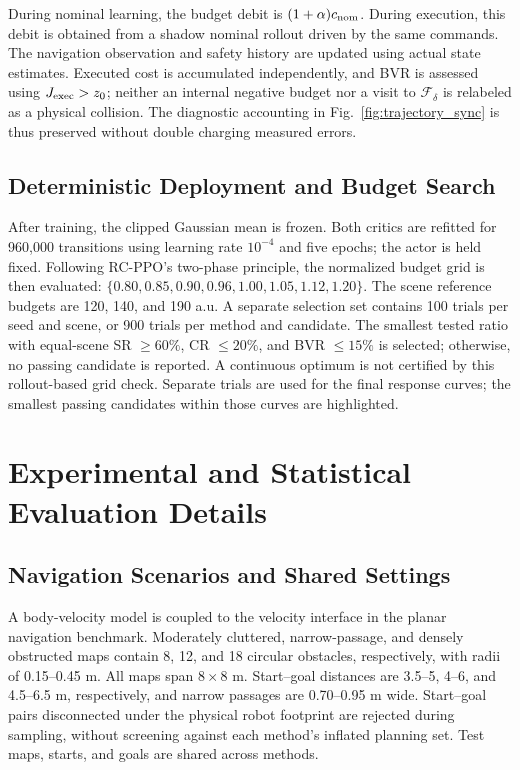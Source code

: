 \documentclass[conference]{IEEEtran}
\begin{document}
During nominal learning, the budget debit is $(1+\alpha)c_{\rm nom}$.
During execution, this debit is obtained from a shadow nominal rollout driven
by the same commands. The navigation observation and safety history are updated
using actual state estimates. Executed cost is accumulated independently, and BVR is assessed using
$J_{\rm exec}>z_0$; neither an internal negative budget nor a visit to
$\mathcal F_\delta$ is relabeled as a physical collision.
The diagnostic accounting in Fig.~\ref{fig:trajectory_sync} is thus preserved
without double charging measured errors.

\subsection{Deterministic Deployment and Budget Search}
\label{app:deployment_search}
After training, the clipped Gaussian mean is frozen. Both critics are refitted
for 960,000 transitions using learning rate $10^{-4}$ and five epochs;
the actor is held fixed. Following RC-PPO's two-phase principle, the normalized
budget grid is then evaluated:
$\{0.80,\allowbreak0.85,\allowbreak0.90,\allowbreak0.96,\allowbreak
1.00,\allowbreak1.05,\allowbreak1.12,\allowbreak1.20\}$.
The scene reference budgets are 120, 140, and 190 a.u.
A separate selection set contains 100 trials per seed and scene, or
900 trials per method and candidate. The smallest tested ratio with equal-scene
SR $\geq60\%$, CR $\leq20\%$, and BVR $\leq15\%$ is selected;
otherwise, no passing candidate is reported. A continuous optimum is not
certified by this rollout-based grid check.
Separate trials are used for the final response curves; the smallest passing
candidates within those curves are highlighted.

\section{Experimental and Statistical Evaluation Details}
\label{app:statistical_evaluation}
\subsection{Navigation Scenarios and Shared Settings}
A body-velocity model is coupled to the velocity interface in the planar
navigation benchmark. Moderately cluttered, narrow-passage, and densely obstructed maps
contain 8, 12, and 18 circular obstacles, respectively, with radii of
0.15--0.45 m. All maps span $8\times8$ m. Start--goal distances are
3.5--5, 4--6, and 4.5--6.5 m, respectively, and narrow passages are
0.70--0.95 m wide. Start--goal pairs disconnected under the physical robot
footprint are rejected during sampling, without screening against each method's
inflated planning set. Test maps, starts, and goals are shared across methods.
\end{document}
